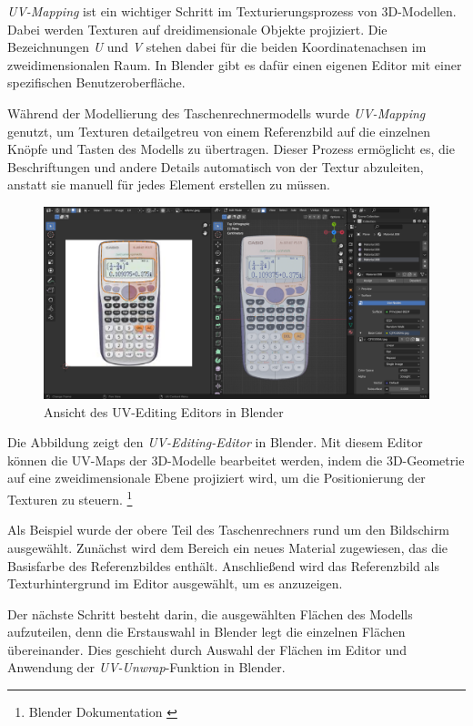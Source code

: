 \textit{UV-Mapping} ist ein wichtiger Schritt im Texturierungsprozess von 3D-Modellen. Dabei werden Texturen auf dreidimensionale Objekte projiziert. Die Bezeichnungen \textit{U} und \textit{V} stehen dabei für die beiden Koordinatenachsen im zweidimensionalen Raum. In Blender gibt es dafür einen eigenen Editor mit einer spezifischen Benutzeroberfläche.

Während der Modellierung des Taschenrechnermodells wurde \textit{UV-Mapping} genutzt, um Texturen detailgetreu von einem Referenzbild auf die einzelnen Knöpfe und Tasten des Modells zu übertragen. Dieser Prozess ermöglicht es, die Beschriftungen und andere Details automatisch von der Textur abzuleiten, anstatt sie manuell für jedes Element erstellen zu müssen.

\begin{figure}[H]
    \centering
    \includegraphics[width=1\textwidth]{images/uvmappingeditor.png}
    \caption{Ansicht des UV-Editing Editors in Blender}
    \label{fig:hierarchie}
\end{figure}

Die Abbildung zeigt den \textit{UV-Editing-Editor} in Blender. Mit diesem Editor können die UV-Maps der 3D-Modelle bearbeitet werden, indem die 3D-Geometrie auf eine zweidimensionale Ebene projiziert wird, um die Positionierung der Texturen zu steuern. \footnote{Blender Dokumentation \cite{UV-Editing Editor}}

Als Beispiel wurde der obere Teil des Taschenrechners rund um den Bildschirm ausgewählt. Zunächst wird dem Bereich ein neues Material zugewiesen, das die Basisfarbe des Referenzbildes enthält. Anschließend wird das Referenzbild als Texturhintergrund im Editor ausgewählt, um es anzuzeigen.

Der nächste Schritt besteht darin, die ausgewählten Flächen des Modells aufzuteilen, denn die Erstauswahl in Blender legt die einzelnen Flächen übereinander. Dies geschieht durch Auswahl der Flächen im Editor und Anwendung der \textit{UV-Unwrap}-Funktion in Blender.

